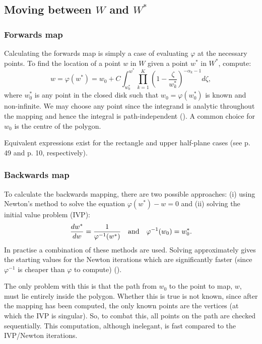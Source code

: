\subsection{Moving between $W$ and $W^*$}

\subsubsection{Forwards map}

Calculating the forwards map is simply a case of evaluating $\varphi$ at the necessary points. To find the location of a point $w$ in $W$ given a point $w^*$ in $W^*$, compute:
\begin{equation}
\label{forwardsmap}
w=\varphi(w^*) = w_0 + C \int_{w^*_0}^{w^*} \prod_{k=1}^{K} \left (1 - \frac{\zeta}{w^*_k} \right )^{-\alpha_k-1} d\zeta,
\end{equation}
where $w^*_0$ is any point in the closed disk such that $w_0 = \varphi(w^*_0)$ is known and non-infinite. We may choose any point since the integrand is analytic throughout the mapping and hence the integral is path-independent (\cite[p. 27]{driscoll}). A common choice for $w_0$ is the centre of the polygon.

Equivalent expressions exist for the rectangle and upper half-plane cases (see \cite{driscoll} p. 49 and p. 10, respectively).

\subsubsection{Backwards map}

To calculate the backwards mapping, there are two possible approaches: (i) using Newton's method to solve the equation $\varphi(w^*)-w=0$ and (ii) solving the initial value problem (IVP):
\begin{equation}
\label{scivp}
\frac{dw^*}{dw}=\frac{1}{\varphi^{-1}(w^*)} \quad \text{and} \quad \varphi^{-1}(w_0)=w^*_0.
\end{equation}
In practise a combination of these methods are used. Solving  approximately gives the starting values for the Newton iterations which are significantly faster (since $\varphi^{-1}$ is cheaper than $\varphi$ to compute) (\cite[p. 29]{driscoll}).

The only problem with this is that the path from $w_0$ to the point to map, $w$, must lie entirely inside the polygon. Whether this is true is not known, since after the mapping has been computed, the only known points are the vertices (at which the IVP is singular). So, to combat this, all points on the path are checked sequentially. This computation, although inelegant, is fast compared to the IVP/Newton iterations.

